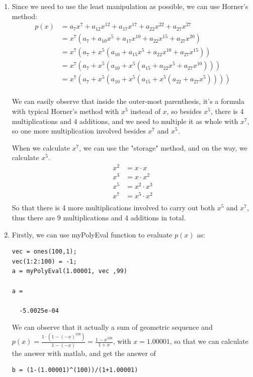 \documentclass{article}
\begin{document}




\begin{enumerate}

\item
Since we need to use the least manipulation as possible, we can use Horner's method:
\begin{align*}
p(x) &= a_7x^7+a_{12}x^{12}+a_{17}x^{17}+a_{22}x^{22}+a_{27}x^{27}\\
&=x^7(a_7+a_{10}x^{5}+a_{17}x^{10}+a_{22}x^{15}+a_{27}x^{20})\\
&=x^7(a_7+x^{5}(a_{10}+a_{15}x^{5}+a_{22}x^{10}+a_{27}x^{15}))\\
&=x^7(a_7+x^{5}(a_{10}+x^{5}(a_{15}+a_{22}x^{5}+a_{27}x^{10})))\\
&=x^7(a_7+x^{5}(a_{10}+x^{5}(a_{15}+x^{5}(a_{22}+a_{27}x^{5}))))\\
\end{align*}

We can easily observe that inside the outer-most parenthesis, it's a formula with typical Horner's method with $x^5$ instead of $x$, so besides $x^5$, there is 4 multiplications and 4 additions, and we need to multiple it as whole with $x^7$, so one more multiplication involved besides $x^7$ and $x^5$.

When we calculate $x^7$, we can use the "storage" method, and on the way, we calculate $x^5$. \begin{align*}
x^2 &= x \cdot x\\
x^3 &= x \cdot x^2\\
x^5 &= x^2 \cdot x^3\\
x^7 &= x^5 \cdot x^2\\ 
\end{align*}
So that there is 4 more multiplications involved to carry out both $x^5$ and $x^7$, thus there are 9 multiplications and 4 additions in total.

\item
Firstly, we can use myPolyEval function to evaluate $p(x)$ as:

\begin{lstlisting}
vec = ones(100,1);
vec(1:2:100) = -1;
a = myPolyEval(1.00001, vec ,99)

a =

  -5.0025e-04
\end{lstlisting}

We can observe that it actually a sum of geometric sequence and $p(x) = \frac{1\cdot(1-(-x)^{100})}{1-(-x)}=\frac{1-x^{100}}{1+x}$, with $x = 1.00001$, so that we can calculate the answer with matlab, and get the answer of \begin{lstlisting}
b = (1-(1.00001)^(100))/(1+1.00001)


\end{lstlisting}
\end{enumerate}
\end{document}
